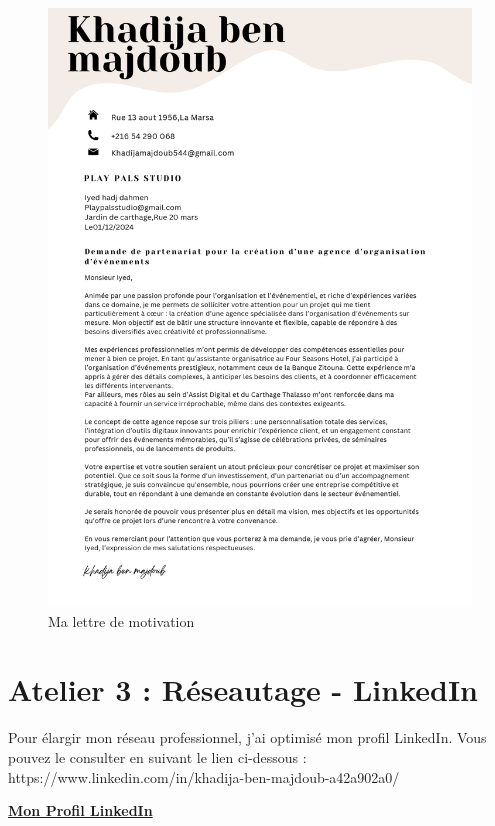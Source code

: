 \documentclass[a4paper,12pt]{article}
\begin{document}
\begin{figure}[H]
    \centering
    \includegraphics[width=\textwidth]{lettredemotivation.pdf} %
    \caption{Ma lettre de motivation}
    \label{fig:lettre}
\end{figure}

\section*{\color{mygreen} Atelier 3 : Réseautage - LinkedIn}
Pour élargir mon réseau professionnel, j'ai optimisé mon profil LinkedIn. Vous pouvez le consulter en suivant le lien ci-dessous : 
https://www.linkedin.com/in/khadija-ben-majdoub-a42a902a0/

\bigskip
\href{https://www.linkedin.com/in/khadija-ben-majdoub-a42a902a0}{\textbf{\color{myorange} Mon Profil LinkedIn}}
\end{document}

